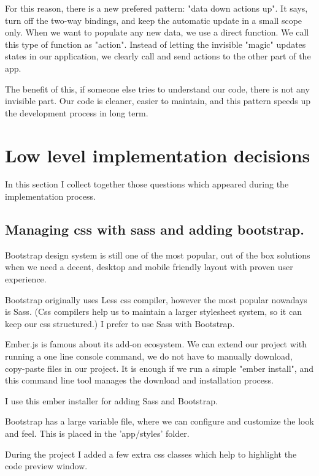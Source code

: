 \documentclass[11pt, a4paper, oneside, openright, medskipamount]{report}
\begin{document}
For this reason, there is a new prefered pattern: "data down actions up". It says, turn off the two-way bindings, and keep the automatic update in a small scope only. When we want to populate any new data, we use a direct function. We call this type of function as "action". Instead of letting the invisible "magic" updates states in our application, we clearly call and send actions to the other part of the app.

The benefit of this, if someone else tries to understand our code, there is not any invisible part. Our code is cleaner, easier to maintain, and this pattern speeds up the development process in long term.

\section{Low level implementation decisions}

In this section I collect together those questions which appeared during the implementation process.

\subsection{Managing css with sass and adding bootstrap.}

Bootstrap\cite{bootstrap} design system is still one of the most popular, out of the box solutions when we need a decent, desktop and mobile friendly layout with proven user experience.

Bootstrap originally uses Less \cite{less} css compiler, however the most popular nowadays is Sass\cite{sass}. (Css compilers help us to maintain a larger stylesheet system, so it can keep our css structured.) I prefer to use Sass with Bootstrap.

Ember.js is famous about its add-on ecosystem. We can extend our project with running a one line console command, we do not have to manually download, copy-paste files in our project. It is enough if we run a simple "ember install", and this command line tool manages the download and installation process.

I use this ember installer for adding Sass and Bootstrap.

Bootstrap has a large variable file, where we can configure and customize the look and feel. This is placed in the 'app/styles' folder.

During the project I added a few extra css classes which help to highlight the code preview window.
\end{document}
